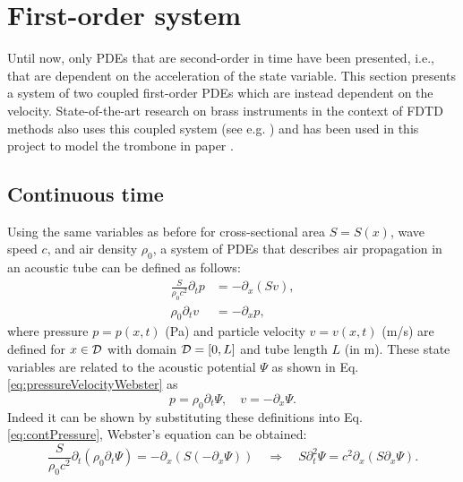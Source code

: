 {%

\section{First-order system}\label{sec:firstOrderSystem}
Until now, only PDEs that are second-order in time have been presented, i.e., that are dependent on the acceleration of the state variable. This section presents a system of two coupled first-order PDEs which are instead dependent on the velocity. State-of-the-art research on brass instruments in the context of FDTD methods also uses this coupled system (see e.g. \cite{Bilbao2016, Harrison2018}) and has been used in this project to model the trombone in paper \citeP[H].

\subsection{Continuous time}\label{sec:firstOrderSystemCont}
Using the same variables as before for cross-sectional area $S=S(x)$, wave speed $c$, and air density $\rho_0$, a system of PDEs that describes air propagation in an acoustic tube can be defined as follows:
\begin{subequations}\label{eq:firstOrderSystem}
\begin{align}
    \frac{S}{\rho_0 c^2}\partial_t p &= -\partial_x(Sv),\label{eq:contPressure}\\
    \rho_0\partial_tv &= -\partial_xp\label{eq:contVelocity},
\end{align}
\end{subequations}
where pressure $p = p(x,t)$ (Pa) and particle velocity $v = v(x,t)$ (m/s) are defined for $x\in \mathcal{D}$ with domain $\mathcal{D} = [0, L]$ and tube length $L$ (in m). These state variables are related to the acoustic potential $\Psi$ as shown in Eq. \eqref{eq:pressureVelocityWebster} as
\begin{equation}\label{eq:pressureVelocityFirstOrder}
    p = \rho_0\partial_t \Psi, \quad v = -\partial_x\Psi.
\end{equation}  
Indeed it can be shown by substituting these definitions into Eq. \eqref{eq:contPressure}, Webster's equation can be obtained:
\begin{equation}
  \nonumber
        \frac{S}{\rho_0 c^2}\partial_t(\rho_0 \partial_t\Psi) = -\partial_x(S(-\partial_x\Psi))\quad \Longrightarrow \quad S\partial_t^2\Psi = c^2\partial_x(S\partial_x\Psi).
\end{equation}


}
